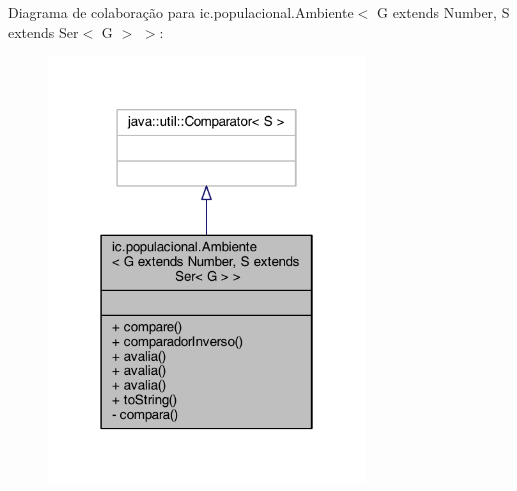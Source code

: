 Diagrama de colaboração para ic.\-populacional.\-Ambiente$<$ G extends Number, S extends Ser$<$ G $>$ $>$\-:\nopagebreak
\begin{figure}[H]
\begin{center}
\leavevmode
\includegraphics[width=238pt]{classic_1_1populacional_1_1_ambiente_3_01_g_01extends_01_number_00_01_s_01extends_01_ser_3_01_g_01_4_01_4__coll__graph}
\end{center}
\end{figure}
